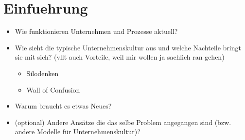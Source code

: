 \chapter{Einfuehrung}
\begin{itemize}
\item Wie funktionieren Unternehmen und Prozesse aktuell? \cite{halstenberg:2020}
\item Wie sieht die typische Unternehmenskultur aus und welche Nachteile bringt sie mit sich? (vllt auch Vorteile, weil mir wollen ja sachlich ran gehen)
	\begin{itemize}
	\item Silodenken
	\item Wall of Confusion
	\end{itemize}
\item Warum braucht es etwas Neues?
\item (optional) Andere Ansätze die das selbe Problem angegangen sind (bzw. andere Modelle für Unternehmenskultur)?
\end{itemize}
